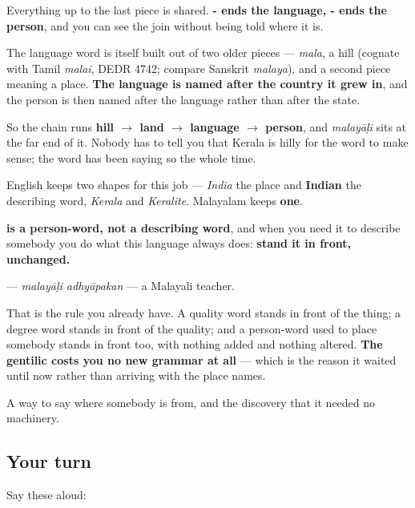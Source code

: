 Everything up to the last piece is shared. \textbf{- ends the language, - ends the person}, and you can see the join without being told where it is.

\begin{culture}
The language word is itself built out of two older pieces — \textbf{} \emph{mala}, a hill (cognate with Tamil \emph{malai}, DEDR 4742; compare Sanskrit \emph{malaya}), and a second piece meaning a place. \textbf{The language is named after the country it grew in}, and the person is then named after the language rather than after the state.

So the chain runs \textbf{hill $\to$ land $\to$ language $\to$ person}, and \emph{malayāḷi} sits at the far end of it. Nobody has to tell you that Kerala is hilly for the word to make sense; the word has been saying so the whole time.
\end{culture}

\begin{grammarlens}[title={Grammar Lens: Malayalam has no separate word for \textquotedblleft{}Keralite\textquotedblright{}}]
English keeps two shapes for this job — \emph{India} the place and \textbf{Indian} the describing word, \emph{Kerala} and \emph{Keralite}. Malayalam keeps \textbf{one}.

\textbf{ is a person-word, not a describing word}, and when you need it to describe somebody you do what this language always does: \textbf{stand it in front, unchanged.}

\textbf{ } — \emph{malayāḷi adhyāpakan} — a Malayali teacher.

That is the rule you already have. A quality word stands in front of the thing; a degree word stands in front of the quality; and a person-word used to place somebody stands in front too, with nothing added and nothing altered. \textbf{The gentilic costs you no new grammar at all} — which is the reason it waited until now rather than arriving with the place names.
\end{grammarlens}

\begin{grammarlens}[title={What you've built}]
A way to say where somebody is from, and the discovery that it needed no machinery.
\end{grammarlens}

\subsection*{Your turn}
Say these aloud:


